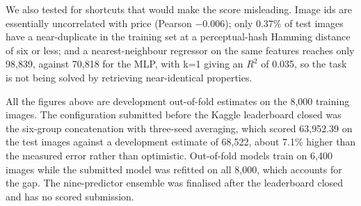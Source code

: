 We also tested for shortcuts that would make the score misleading. Image ids are essentially uncorrelated with price (Pearson \ensuremath{-}0.006); only 0.37\% of test images have a near-duplicate in the training set at a perceptual-hash Hamming distance of six or less; and a nearest-neighbour regressor on the same features reaches only 98,839, against 70,818 for the MLP, with k=1 giving an $R^2$ of 0.035, so the task is not being solved by retrieving near-identical properties.


All the figures above are development out-of-fold estimates on the 8,000 training images. The configuration submitted before the Kaggle leaderboard closed was the six-group concatenation with three-seed averaging, which scored 63,952.39 on the test images against a development estimate of 68,522, about 7.1\% higher than the measured error rather than optimistic. Out-of-fold models train on 6,400 images while the submitted model was refitted on all 8,000, which accounts for the gap. The nine-predictor ensemble was finalised after the leaderboard closed and has no scored submission.


